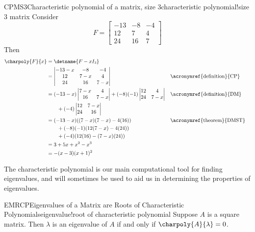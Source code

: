 %
%
\begin{example}{CPMS3}{Characteristic polynomial of a matrix, size 3}{characteristic polynomial!size 3 matrix}
Consider
%
\begin{equation*}
F=
\begin{bmatrix}
-13 & -8 & -4\\
12 & 7 & 4\\
24 & 16 & 7
\end{bmatrix}
\end{equation*}
%
Then
%
\begin{align*}
\charpoly{F}{x}&=\detname{F-xI_3}\\
&=
\begin{vmatrix}
-13-x & -8 & -4\\
12 & 7-x & 4\\
24 & 16 & 7-x
\end{vmatrix}&&\text{\acronymref{definition}{CP}}\\
%
&=
(-13-x)
\begin{vmatrix}
7-x & 4\\
16 & 7-x
\end{vmatrix}
+(-8)(-1)
\begin{vmatrix}
12  & 4\\
24  & 7-x
\end{vmatrix}&&\text{\acronymref{definition}{DM}}\\
&\quad\quad
+(-4)
\begin{vmatrix}
12 & 7-x\\
24 & 16
\end{vmatrix}\\
%
&=(-13-x)((7-x)(7-x)-4(16))&&\text{\acronymref{theorem}{DMST}}\\
&\quad\quad +(-8)(-1)(12(7-x)-4(24))\\
&\quad\quad +(-4)(12(16)-(7-x)(24))\\
%
&=3+5x+x^2-x^3\\
%
&=-(x-3)(x+1)^2
%
\end{align*}
%
\end{example}
%
The characteristic polynomial is our main computational tool for finding eigenvalues, and will sometimes be used to aid us in determining the properties of eigenvalues.
%
\begin{theorem}{EMRCP}{Eigenvalues of a Matrix are Roots of Characteristic Polynomials}{eigenvalue!root of characteristic polynomial}
Suppose $A$ is a square matrix.
Then $\lambda$ is an eigenvalue of $A$ if and only if $\charpoly{A}{\lambda}=0$.
\end{theorem}

